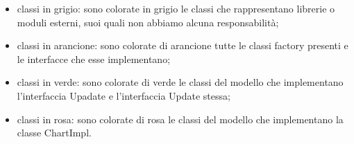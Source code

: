\begin{itemize}
\item classi in grigio: sono colorate in grigio le classi che rappresentano librerie o moduli esterni, suoi quali non abbiamo alcuna responsabilità;
\item classi in arancione: sono colorate di arancione tutte le classi factory presenti e le interfacce che esse implementano;
\item classi in verde: sono colorate di verde le classi del modello che implementano l'interfaccia Upadate e l'interfaccia Update stessa;
\item classi in rosa: sono colorate di rosa le classi del modello che implementano la classe ChartImpl. 
\end{itemize}






